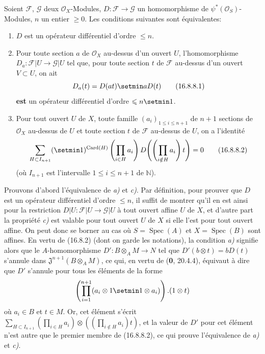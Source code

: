 \begin{proposition}[16.8.8]
\label{IV.16.8.8}
Soient $\mathscr{F}$, $\mathscr{G}$ deux $\mathcal{O}_X$-Modules,
$D:\mathscr{F}\to\mathscr{G}$ un homomorphisme de
$\psi^*(\mathcal{O}_S)$-Modules, $n$ un entier $\geq0$. Les conditions
suivantes sont équivalentes:
\begin{enumerate}
  \item[\textup{a)}] $D$ est un opérateur différentiel d'ordre $\leq n$.
  \item[\textup{b)}] Pour toute section $a$ de $\mathcal{O}_X$ au-dessus d'un ouvert
  $U$, l'homomorphisme $D_a:\mathscr{F}|U\to\mathscr{G}|U$ tel que, pour
  toute section $t$ de $\mathscr{F}$ au-dessus d'un ouvert $V\subset U$, on
  ait
  \[
    D_a(t)=D(at)\setmin aD(t)
    \tag{16.8.8.1}
    \label{IV.16.8.8.1}
  \]
  \textbf{est} un opérateur différentiel d'ordre $\leq n\setmin 1$.
  \item[\textup{c)}] Pour tout ouvert $U$ de $X$, toute famille
  $(a_i)_{1\leq i\leq n+1}$ de $n+1$ sections de $\mathcal{O}_X$ au-dessus
  de $U$ et toute section $t$ de $\mathscr{F}$ au-dessus de $U$, on a
  l'identité
  \[
    \sum_{H\subset I_{n+1}}(\setmin 1)^{\operatorname{Card}(H)}
    \left(\prod_{i\in H}a_i\right)
    D\!\left(\left(\prod_{i\notin H}a_i\right)t\right)=0
    \tag{16.8.8.2}
    \label{IV.16.8.8.2}
  \]
  (où $I_{n+1}$ est l'intervalle $1\leq i\leq n+1$ de $\mathbb{N}$).
\end{enumerate}
\end{proposition}

Prouvons d'abord l'équivalence de \emph{a)} et \emph{c)}. Par définition, pour prouver que
$D$ est un opérateur différentiel d'ordre $\leq n$, il suffit de montrer qu'il
en est ainsi pour la restriction
$D|U:\mathscr{F}|U\to\mathscr{G}|U$ à tout ouvert affine $U$ de $X$, et
d'autre part la propriété \emph{c)} est valable pour tout ouvert $U$ de $X$ si elle
l'est pour tout ouvert affine. On peut donc se borner au cas où
$S=\operatorname{Spec}(A)$ et $X=\operatorname{Spec}(B)$ sont affines. En
vertu de (16.8.2) (dont on garde les notations), la condition \emph{a)} signifie
alors que le $A$-homomorphisme $D':B\otimes_A M\to N$ tel que
$D'(b\otimes t)=bD(t)$ s'annule dans
$\mathfrak{J}^{n+1}(B\otimes_A M)$, ce qui, en vertu de (\textbf{0}, 20.4.4), équivaut
à dire que $D'$ s'annule pour tous les éléments de la forme
\[
  \left(\prod_{i=1}^{n+1}(a_i\otimes1\setmin 1\otimes a_i)\right).(1\otimes t)
\]
où $a_i\in B$ et $t\in M$. Or, cet élément s'écrit
$\sum_{H\subset I_{n+1}}(\prod_{i\in H}a_i)\otimes((\prod_{i\notin H}a_i)t)$,
et la valeur de $D'$ pour cet élément n'est autre que le premier membre de
(16.8.8.2), ce qui prouve l'équivalence de \emph{a)} et \emph{c)}.

